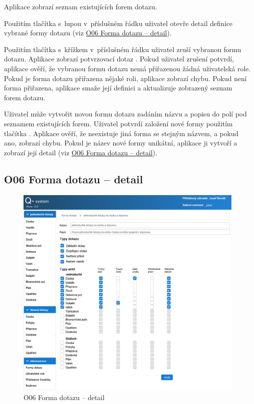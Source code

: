 \documentclass[thesis=M,czech]{FITthesis}[2019/12/23]
\begin{document}
Aplikace zobrazí seznam existujících forem dotazu.

Použitím tlačítka s~lupou v~příslušném řádku uživatel otevře detail definice vybrané formy dotazu (viz \hyperref[O06FormaDotazuDetail]{O06 Forma dotazu – detail}).

Použitím tlačítka s~křížkem v~příslušném řádku uživatel zruší vybranou formu dotazu. Aplikace zobrazí potvrzovací dotaz . Pokud uživatel zrušení potvrdí, aplikace ověří, že vybranou formu dotazu nemá přiřazenou žádná uživatelská role. Pokud je forma dotazu přiřazena nějaké roli, aplikace zobrazí chybu. Pokud není forma přiřazena, aplikace smaže její definici a aktualizuje zobrazený seznam forem dotazu.

Uživatel může vytvořit novou formu dotazu zadáním názvu a popisu do polí pod seznamem existujících forem. Uživatel potvrdí založení nové formy použitím tlačítka . Aplikace ověří, že neexistuje jiná forma se stejným názvem, a pokud ano, zobrazí chybu. Pokud je název nové formy unikátní, aplikace ji vytvoří a zobrazí její detail (viz \hyperref[O06FormaDotazuDetail]{O06 Forma dotazu – detail}).

\subsection{O06 Forma dotazu -- detail}
\label{O06FormaDotazuDetail}
\begin{figure}[H]
  \centering
  \includegraphics[width=\textwidth]{res/screens/O06 Forma dotazu - detail.png}
  \caption{O06 Forma dotazu -- detail}
  \label{fig:O06 Forma dotazu -- detail}
\end{figure}
\end{document}
